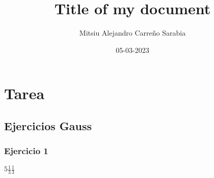 \documentclass{article}
\title{Title of my document}
\date{05-03-2023}
\author{Mitsiu Alejandro Carreño Sarabia}
\begin{document}
\maketitle
{}
\newpage
{}

\section{Tarea}

\subsection{Ejercicios Gauss}

\subsubsection{Ejercicio 1}

$5{\scriptstyle\frac{1}{3}}  \frac{1}{3}$
\end{document}
